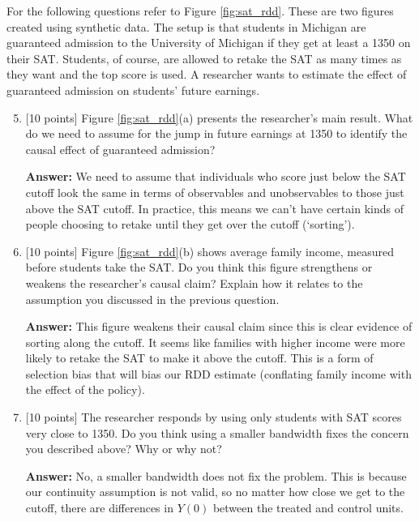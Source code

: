 \documentclass[12pt]{article}
\newcommand{\answer}[1]{{\color{blue_winged_teal}\textbf{Answer:} #1}}
\newcommand{\pts}[1]{{\color{zinc500}[#1 points]}}
\begin{document}
\newpage
\noindent
For the following questions refer to Figure \ref{fig:sat_rdd}.
These are two figures created using synthetic data.
The setup is that students in Michigan are guaranteed admission to the University of Michigan if they get at least a 1350 on their SAT.
Students, of course, are allowed to retake the SAT as many times as they want and the top score is used.
A researcher wants to estimate the effect of guaranteed admission on students' future earnings.

\medskip
\begin{enumerate}
  \setcounter{enumi}{4}
  \item \pts{10} Figure \ref{fig:sat_rdd}(a) presents the researcher's main result.
  What do we need to assume for the jump in future earnings at 1350 to identify the causal effect of guaranteed admission?

  \answer{
    We need to assume that individuals who score just below the SAT cutoff look the same in terms of observables and unobservables to those just above the SAT cutoff.
    In practice, this means we can't have certain kinds of people choosing to retake until they get over the cutoff (`sorting').
  }

  \medskip
  \item \pts{10} Figure \ref{fig:sat_rdd}(b) shows average family income, measured before students take the SAT.
  Do you think this figure strengthens or weakens the researcher's causal claim?
  Explain how it relates to the assumption you discussed in the previous question.

  \answer{
    This figure weakens their causal claim since this is clear evidence of sorting along the cutoff. 
    It seems like families with higher income were more likely to retake the SAT to make it above the cutoff.
    This is a form of selection bias that will bias our RDD estimate (conflating family income with the effect of the policy).
  }

  \medskip
  \item \pts{10} The researcher responds by using only students with SAT scores very close to 1350.
  Do you think using a smaller bandwidth fixes the concern you described above?
  Why or why not?

  \answer{
    No, a smaller bandwidth does not fix the problem. 
    This is because our continuity assumption is not valid, so no matter how close we get to the cutoff, there are differences in $Y(0)$ between the treated and control units.
  }
\end{enumerate}
\end{document}
